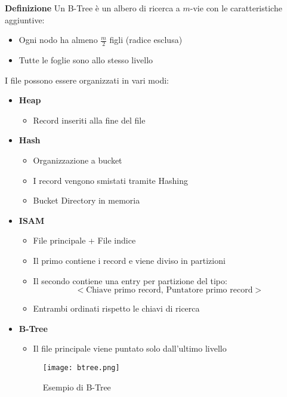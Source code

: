 \documentclass{article}
\begin{document}
\noindent\textbf{Definizione} Un B-Tree è un albero di ricerca a $m$-vie con le caratteristiche aggiuntive:
\begin{itemize}
    \item Ogni nodo ha almeno $\frac{m}{2}$ figli (radice esclusa)
    \item Tutte le foglie sono allo stesso livello\newline
\end{itemize}

\noindent I file possono essere organizzati in vari modi:
\begin{itemize}
    \item \textbf{Heap}
        \begin{itemize}
            \item Record inseriti alla fine del file
        \end{itemize}

    \item \textbf{Hash}
        \begin{itemize}
            \item Organizzazione a bucket
            \item I record vengono smistati tramite Hashing
            \item Bucket Directory in memoria
        \end{itemize}

    \item \textbf{ISAM}
        \begin{itemize}
            \item File principale + File indice
            \item Il primo contiene i record e viene diviso in partizioni
            \item Il secondo contiene una entry per partizione del tipo: 
            $$<\text{Chiave primo record, Puntatore primo record}>$$
            \item Entrambi ordinati rispetto le chiavi di ricerca
        \end{itemize}

    \item \textbf{B-Tree}
        \begin{itemize}
            \item Il file principale viene puntato solo dall'ultimo livello
        \end{itemize}
        
        \begin{figure}[H]
            \centering
            \texttt{[image: btree.png]}
            \caption{Esempio di B-Tree}
        \end{figure}
        
\end{itemize}
\end{document}
